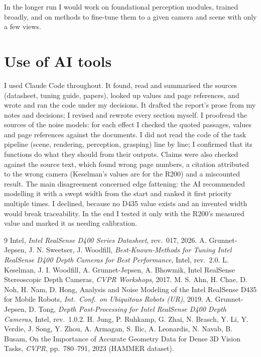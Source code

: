 \documentclass[10pt,a4paper]{article}
\begin{document}
In the longer run I would work on foundational perception modules, trained broadly, and on methods to fine-tune them to a given
camera and scene with only a few views.

\section*{Use of AI tools}
I used Claude Code throughout. It found, read and summarised the sources (datasheet, tuning guide, papers),
looked up values and page references, and wrote and ran the code under my decisions. It drafted the report's
prose from my notes and decisions; I revised and rewrote every section myself. I proofread the sources of the noise models: for each effect I
checked the quoted passages, values and page references against the documents. I did not read the code of the
task pipeline (scene, rendering, perception, grasping) line by line; I confirmed that its functions do what
they should from their outputs. Claims were also checked against the source text, which found
wrong page numbers, a citation attributed to the wrong camera (Keselman's values are for the R200) and a
miscounted result. The main disagreement concerned edge fattening: the AI recommended modelling it with a
swept width from the start and ranked it first priority multiple times. I declined, because no D435 value exists and an
invented width would break traceability. In the end I tested it only with the R200's measured value and marked
it as needing calibration.

\begin{thebibliography}{9}
 Intel, \emph{Intel RealSense D400 Series Datasheet}, rev.\ 017, 2026.
 A. Grunnet-Jepsen, J. N. Sweetser, J. Woodfill, \emph{Best-Known-Methods for Tuning Intel
RealSense D400 Depth Cameras for Best Performance}, Intel, rev.\ 2.0.
 L. Keselman, J. I. Woodfill, A. Grunnet-Jepsen, A. Bhowmik, Intel RealSense Stereoscopic
Depth Cameras, \emph{CVPR Workshops}, 2017.
 M. S. Ahn, H. Chae, D. Noh, H. Nam, D. Hong, Analysis and Noise Modeling of the Intel RealSense
D435 for Mobile Robots, \emph{Int.\ Conf.\ on Ubiquitous Robots (UR)}, 2019.
 A. Grunnet-Jepsen, D. Tong, \emph{Depth Post-Processing for Intel RealSense D400 Depth Cameras},
Intel, rev.\ 1.0.2.
 H. Jung, P. Ruhkamp, G. Zhai, N. Brasch, Y. Li, Y. Verdie, J. Song, Y. Zhou, A. Armagan,
S. Ilic, A. Leonardis, N. Navab, B. Busam, On the Importance of Accurate Geometry Data for Dense 3D Vision
Tasks, \emph{CVPR}, pp.\ 780--791, 2023 (HAMMER dataset).
\end{thebibliography}
\end{document}
